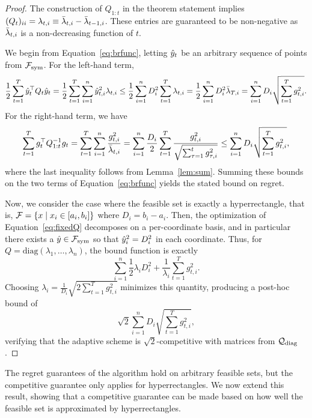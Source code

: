 \begin{proof}  
The construction of $Q_{1:t}$ in the theorem statement implies
$(Q_t)_{ii} = \lambda_{t, i} \equiv \bar{\lambda}_{t, i} - \bar{\lambda}_{t-1, i}$.  These
entries are guaranteed to be non-negative as $\bar{\lambda}_{t,i}$ is a
non-decreasing function of $t$.

We begin from Equation~\eqref{eq:brfunc}, letting $\hat{y}_t$ be an
arbitrary sequence of points from $\mathcal{F}_{\text{sym}}$. For the left-hand term,
\[ 
   \frac{1}{2} \sum_{t=1}^T \hat{y}_t^\top Q_t\hat{y}_t 
  = \frac{1}{2}\sum_{t=1}^T \sum_{i=1}^n \hat{y}_{t,i}^2 \lambda_{t,i}
  \leq \frac{1}{2}\sum_{i=1}^n D_i^2 \sum_{t=1}^T\lambda_{t,i}
  = \frac{1}{2}\sum_{i=1}^n D_i^2 \bar{\lambda}_{T,i}
  = \sum_{i=1}^n D_i \sqrt{\sum_{t=1}^T g^2_{t, i}}.
\] 
For the right-hand term, we have 
\[
 \sum_{t=1}^T g_t^\top Q_{1:t}^{-1}g_t
  = \sum_{t=1}^T \sum_{i=1}^n \frac{g_{t,i}^2}{\bar{\lambda}_{t,i}}
  = \sum_{i=1}^n \frac{D_i}{2}\sum_{t=1}^T  
       \frac{g_{t,i}^2}{\sqrt {\sum_{\tau=1}^{t} g^2_{\tau, i}}}
 \leq \sum_{i=1}^n D_i \sqrt{\sum_{t=1}^T g_{t,i}^2},
\]
where the last inequality follows from Lemma~\ref{lem:sum}.  Summing these
bounds on the two terms of Equation~\eqref{eq:brfunc}
yields the stated bound on regret.

Now, we consider the case where the feasible set is exactly a
hyperrectangle, that is, $\mathcal{F} = \left\{x
\mid x_i \in [a_i, b_i]\right\}$ where $D_i = b_i - a_i$.  Then,
the optimization of Equation~\eqref{eq:fixedQ} decomposes on a
per-coordinate basis, and in particular there exists
a $\hat{y} \in \mathcal{F}_{\text{sym}}$ so that $\hat{y}_i^2 = D_i^2$ in each coordinate.
Thus, for $Q = \text{diag}(\lambda_1, \dots, \lambda_n)$,
the bound function is exactly
\[\sum_{i=1}^n \frac{1}{2} \lambda_i D_i^2 
+ \frac{1}{\lambda_i}\sum_{t=1}^T g_{t,i}^2.
\]
Choosing $\lambda_i =
\frac{1}{D_i}\sqrt{2\sum_{t=1}^T g^2_{t, i}}$ minimizes this quantity, producing a
post-hoc bound of
\[\sqrt{2}\sum_{i=1}^n D_i \sqrt{\sum_{t=1}^T g_{t,i}^2},\]
verifying that the adaptive scheme is $\sqrt{2}$-competitive with
matrices from $\mathcal{Q}_{\text{diag}}$.

\end{proof}


The regret guarantees of the \FTPRLdiag algorithm hold on arbitrary
feasible sets, but the competitive guarantee only applies for
hyperrectangles.  We now extend this result, showing that a
competitive guarantee can be made based on how well the feasible set
is approximated by hyperrectangles.

\newcommand{\Hout}{H^{\text{out}}}
\newcommand{\Hin}{H^{\text{in}}}

